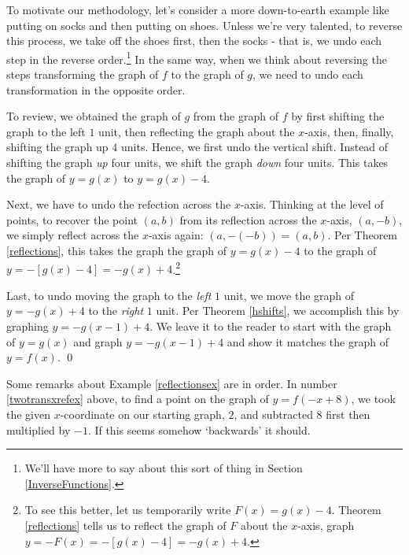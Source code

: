 \documentclass{ximera}
\begin{document}
\begin{example}
\begin{enumerate}
 \smallskip
 
 To motivate our methodology, let's consider a more down-to-earth example like putting on socks and then putting on shoes.  Unless we're very talented,  to reverse this process, we take off the shoes first, then the socks - that is, we undo each step in the reverse order.\footnote{We'll have more to say about this sort of thing in Section \ref{InverseFunctions}.}  In the same way, when we think about reversing the steps transforming the graph of $f$ to the graph of $g$, we need to undo each transformation in the opposite order.  
 
 \smallskip
 
 To review, we obtained the graph of $g$ from the graph of $f$ by first shifting the graph to the left $1$ unit, then reflecting the graph about the $x$-axis, then, finally, shifting the graph up $4$ units.  Hence, we first undo the vertical shift.  Instead of shifting the graph \textit{up} four units, we shift the graph \textit{down} four units.  This takes the graph of $y = g(x)$ to $y = g(x)-4$.  
 
 \smallskip
 
 Next, we have to undo the refection across the $x$-axis.  Thinking at the level of points, to recover the point $(a,b)$ from its reflection across the $x$-axis, $(a,-b)$, we simply reflect across the $x$-axis again: $(a,-(-b)) = (a,b)$.  Per Theorem \ref{reflections}, this takes the graph the graph of $y = g(x)-4$ to the graph of $y = -[g(x)-4] = -g(x) + 4$.\footnote{To see this better, let us temporarily write $F(x) = g(x)-4$.  Theorem \ref{reflections} tells us to reflect the graph of $F$ about the $x$-axis, graph $y=-F(x) = - [g(x)-4] = -g(x)+4$.} 
 
 \smallskip
 
 Last, to undo moving the graph to the \textit{left} $1$ unit, we move the graph of $y=-g(x)+4$ to the \textit{right} $1$ unit.  Per Theorem \ref{hshifts}, we accomplish this by graphing $y = -g(x-1)+4$.  We leave it to the reader to start with the graph of $y=g(x)$ and graph $y = -g(x-1)+4$ and show it matches the graph of $y=f(x)$. \qed
    
 \end{enumerate}

\end{example}

Some remarks about Example \ref{reflectionsex}  are in order. In number \ref{twotransxrefex} above, to find a point on the graph of $y=f(-x+8)$, we took the given $x$-coordinate on our starting graph, $2$, and subtracted $8$ first then multiplied by $-1$.  If this seems somehow `backwards' it should.  
\end{document}
